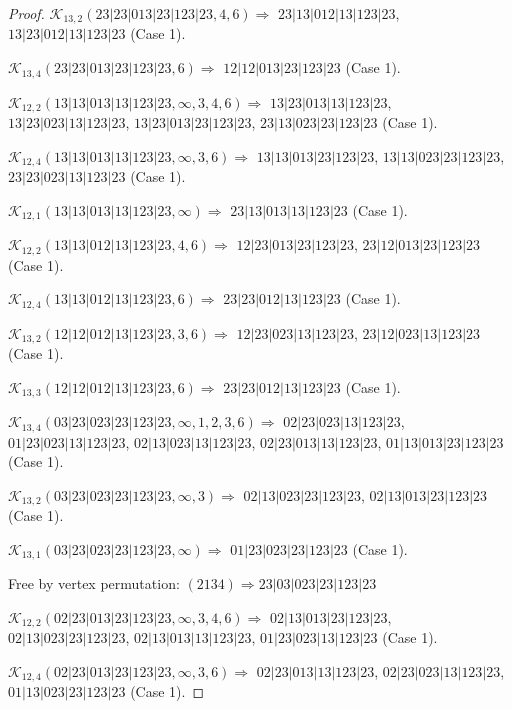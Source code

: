 \documentclass[12pt]{article}
\theoremstyle{plain}
\theoremstyle{definition}
\theoremstyle{remark}
\newcommand{\fancy}[1]{\mathcal{#1}}
\def\K{\fancy{K}}
\begin{document}
\begin{proof}
	
	\bigskip
	
	$\K_{13,2}(23|23|013|23|123|23,4, 6)\Rightarrow $ $23|13|012|13|123|23$, $13|23|012|13|123|23$ (Case 1).
	
	$\K_{13,4}(23|23|013|23|123|23,6)\Rightarrow $ $12|12|013|23|123|23$ (Case 1).
	
	
	\bigskip
	
	$\K_{12,2}(13|13|013|13|123|23,\infty,3, 4, 6)\Rightarrow $ $13|23|013|13|123|23$, $13|23|023|13|123|23$, $13|23|013|23|123|23$, $23|13|023|23|123|23$ (Case 1).
	
	$\K_{12,4}(13|13|013|13|123|23,\infty,3, 6)\Rightarrow $ $13|13|013|23|123|23$, $13|13|023|23|123|23$, $23|23|023|13|123|23$ (Case 1).
	
	$\K_{12,1}(13|13|013|13|123|23,\infty)\Rightarrow $ $23|13|013|13|123|23$ (Case 1).
	
	
	\bigskip
	
	$\K_{12,2}(13|13|012|13|123|23,4, 6)\Rightarrow $ $12|23|013|23|123|23$, $23|12|013|23|123|23$ (Case 1).
	
	$\K_{12,4}(13|13|012|13|123|23,6)\Rightarrow $ $23|23|012|13|123|23$ (Case 1).
	
	
	\bigskip
	
	$\K_{13,2}(12|12|012|13|123|23,3, 6)\Rightarrow $ $12|23|023|13|123|23$, $23|12|023|13|123|23$ (Case 1).
	
	$\K_{13,3}(12|12|012|13|123|23,6)\Rightarrow $ $23|23|012|13|123|23$ (Case 1).
	
	
	\bigskip
	
	$\K_{13,4}(03|23|023|23|123|23,\infty,1, 2, 3, 6)\Rightarrow $ $02|23|023|13|123|23$, $01|23|023|13|123|23$, $02|13|023|13|123|23$, $02|23|013|13|123|23$, $01|13|013|23|123|23$ (Case 1).
	
	$\K_{13,2}(03|23|023|23|123|23,\infty,3)\Rightarrow $ $02|13|023|23|123|23$, $02|13|013|23|123|23$ (Case 1).
	
	$\K_{13,1}(03|23|023|23|123|23,\infty)\Rightarrow $ $01|23|023|23|123|23$ (Case 1).
	
	
	
	Free by vertex permutation: $(2 1 3 4)\Rightarrow 23|03|023|23|123|23$
	
	
	
	\bigskip
	
	$\K_{12,2}(02|23|013|23|123|23,\infty,3, 4, 6)\Rightarrow $ $02|13|013|23|123|23$, $02|13|023|23|123|23$, $02|13|013|13|123|23$, $01|23|023|13|123|23$ (Case 1).
	
	$\K_{12,4}(02|23|013|23|123|23,\infty,3, 6)\Rightarrow $ $02|23|013|13|123|23$, $02|23|023|13|123|23$, $01|13|023|23|123|23$ (Case 1).
	

\end{proof}
\end{document}
